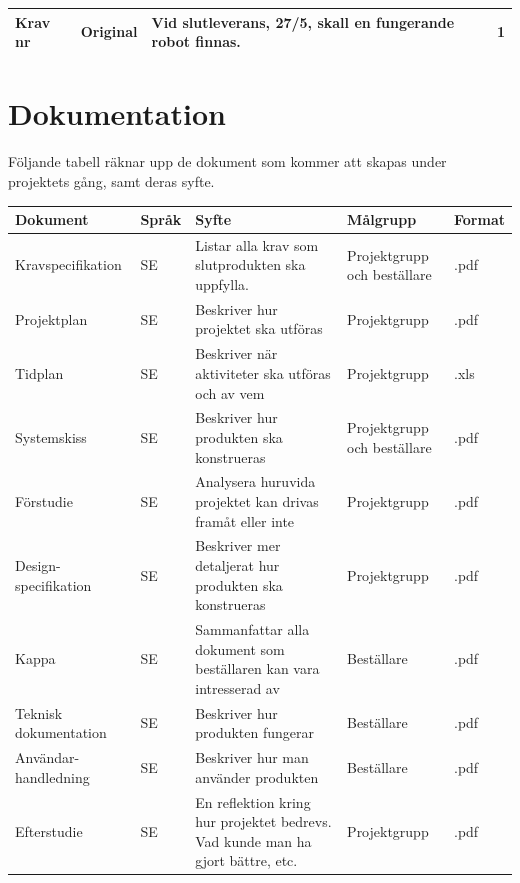\documentclass[11pt]{article}
\newcounter{kravc}
\newcommand{\kravcc}{
	\thekravc
	\stepcounter{kravc}
}
\begin{document}
\begin{flushleft}
\begin{center}
\begin{longtable}{|l|l|p{.70\linewidth}|l|}
Krav nr\kravcc &
Original &
Vid slutleverans, 27/5, skall en fungerande robot finnas. &
1 \\ \hline

\end{longtable}
\end{center}


\pagebreak

\section{Dokumentation}
Följande tabell räknar upp de dokument som kommer att skapas under projektets gång, samt deras syfte.
\begin{center}
\begin{longtable}{|p{.24\linewidth}|p{.08\linewidth}|p{.25\linewidth}|p{.19\linewidth}|p{.1\linewidth}|}\hline
\textbf{Dokument} & \textbf{Språk} & \textbf{Syfte} & \textbf{Målgrupp} & \textbf{Format} \\ \hline

Kravspecifikation & SE & Listar alla krav som slutprodukten ska uppfylla. & Projektgrupp och beställare & .pdf \\ \hline
Projektplan & SE & Beskriver hur projektet ska utföras & Projektgrupp & .pdf \\ \hline
Tidplan & SE & Beskriver när aktiviteter ska utföras och av vem & Projektgrupp & .xls \\ \hline
Systemskiss & SE & Beskriver hur produkten ska konstrueras& Projektgrupp och beställare & .pdf \\ \hline
Förstudie & SE & Analysera huruvida projektet kan drivas framåt eller inte & Projektgrupp & .pdf \\ \hline
Design-specifikation & SE & Beskriver mer detaljerat hur produkten ska konstrueras & Projektgrupp & .pdf \\ \hline
Kappa & SE & Sammanfattar alla dokument som beställaren kan vara intresserad av & Beställare & .pdf \\ \hline
Teknisk dokumentation & SE & Beskriver hur produkten fungerar & Beställare & .pdf \\ \hline
Användar-handledning & SE & Beskriver hur man använder produkten& Beställare & .pdf \\ \hline
Efterstudie & SE & En reflektion kring hur projektet bedrevs. Vad kunde man ha gjort bättre, etc.& Projektgrupp & .pdf \\ \hline

\end{longtable}
\end{center}


\end{flushleft}
\end{document}
